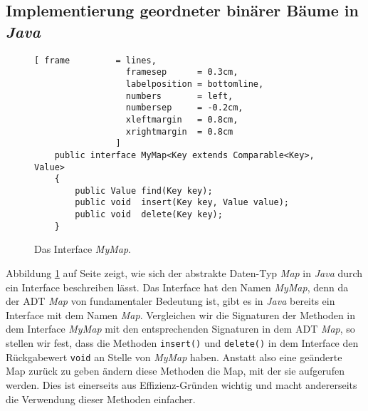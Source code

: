 \subsection{Implementierung geordneter bin\"arer B\"aume in \textsl{Java}}
\begin{figure}[!ht]
  \centering
\begin{Verbatim}[ frame         = lines, 
                  framesep      = 0.3cm, 
                  labelposition = bottomline,
                  numbers       = left,
                  numbersep     = -0.2cm,
                  xleftmargin   = 0.8cm,
                  xrightmargin  = 0.8cm
                ]
    public interface MyMap<Key extends Comparable<Key>, Value>
    {
        public Value find(Key key);
        public void  insert(Key key, Value value);
        public void  delete(Key key);
    }
\end{Verbatim}
\vspace*{-0.3cm}
  \caption{Das Interface  \textsl{MyMap}.}
  \label{fig:MyMap.java}
\end{figure}

Abbildung \ref{fig:MyMap.java} auf Seite \pageref{fig:MyMap.java} zeigt, 
wie sich der abstrakte Daten-Typ \textsl{Map} in \textsl{Java} durch ein
Interface beschreiben l\"asst.  Das Interface hat den Namen \textsl{MyMap}, denn da der ADT
\textsl{Map} von  fundamentaler Bedeutung ist, gibt es in \textsl{Java} bereits ein
Interface mit dem Namen \textsl{Map}.  Vergleichen wir die Signaturen der Methoden in dem
Interface \textsl{MyMap} mit den entsprechenden Signaturen in dem ADT \textsl{Map}, so
stellen wir fest, dass die Methoden \texttt{insert()} und \texttt{delete()} in dem
Interface den R\"uckgabewert \texttt{void} an Stelle von \textsl{MyMap} haben.
Anstatt also eine ge\"anderte Map zur\"uck zu geben \"andern diese Methoden die Map, mit der sie
aufgerufen werden.  Dies ist einerseits aus Effizienz-Gr\"unden wichtig und macht
andererseits die Verwendung dieser Methoden einfacher.


